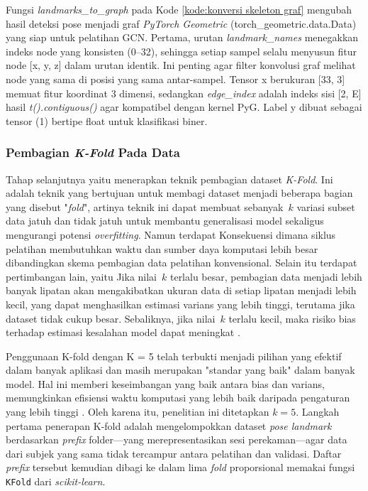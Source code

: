 \vspace{10pt}

Fungsi \textit{landmarks\_to\_graph} pada Kode \ref{kode:konversi skeleton graf} mengubah hasil deteksi pose menjadi graf \textit{PyTorch Geometric} (torch\_geometric.data.Data) yang siap untuk pelatihan GCN. Pertama, urutan \textit{landmark\_names} menegakkan indeks node yang konsisten (0–32), sehingga setiap sampel selalu menyusun fitur node [x, y, z] dalam urutan identik. Ini penting agar filter konvolusi graf melihat node yang sama di posisi yang sama antar-sampel. Tensor x berukuran [33, 3] memuat fitur koordinat 3 dimensi, sedangkan \textit{edge\_index} adalah indeks sisi [2, E] hasil \textit{t().contiguous()} agar kompatibel dengan kernel PyG. Label y dibuat sebagai tensor (1) bertipe float untuk klasifikasi biner. \par


\subsubsection{Pembagian \textit{K-Fold} Pada Data}

Tahap selanjutnya yaitu menerapkan teknik pembagian dataset \textit{K-Fold}. Ini adalah teknik yang bertujuan untuk membagi dataset menjadi beberapa bagian yang disebut "\textit{fold}", artinya teknik ini dapat membuat sebanyak~$k$ variasi subset data jatuh dan tidak jatuh untuk membantu generalisasi model sekaligus mengurangi potensi \textit{overfitting}. Namun terdapat Konsekuensi dimana siklus pelatihan membutuhkan waktu dan sumber daya komputasi lebih besar dibandingkan skema pembagian data pelatihan konvensional. Selain itu terdapat pertimbangan lain, yaitu Jika nilai~$k$ terlalu besar, pembagian data menjadi lebih banyak lipatan akan mengakibatkan ukuran data di setiap lipatan menjadi lebih kecil, yang dapat menghasilkan estimasi varians yang lebih tinggi, terutama jika dataset tidak cukup besar. Sebaliknya, jika nilai~$k$ terlalu kecil, maka risiko bias terhadap estimasi kesalahan model dapat meningkat \cite{Hadjisolomou2021}.

Penggunaan K-fold dengan K = 5 telah terbukti menjadi pilihan yang efektif dalam banyak aplikasi dan masih merupakan "standar yang baik" dalam banyak model. Hal ini memberi keseimbangan yang baik antara bias dan varians, memungkinkan efisiensi waktu komputasi yang lebih baik daripada pengaturan yang lebih tinggi \cite{Hadjisolomou2021}. Oleh karena itu, penelitian ini ditetapkan $k = 5$. Langkah pertama penerapan K-fold adalah mengelompokkan dataset \textit{pose landmark} berdasarkan \textit{prefix} folder—yang merepresentasikan sesi perekaman—agar data dari subjek yang sama tidak tercampur antara pelatihan dan validasi. Daftar \textit{prefix} tersebut kemudian dibagi ke dalam lima \textit{fold} proporsional memakai fungsi \texttt{KFold} dari \textit{scikit-learn}. \par

